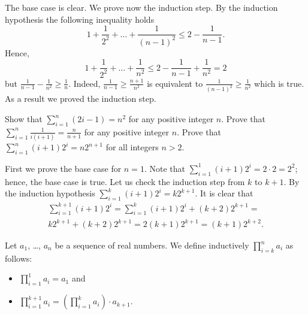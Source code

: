 \begin{chapterendexercises}
\begin{solution}
        The base case is clear. We prove now the induction step. By the induction
        hypothesis the following inequality holds
        \[
          1 + \frac{1}{2^2} + \dots + \frac{1}{(n - 1)^2} \le 2 - \frac{1}{n - 1}.
        \]
        Hence,
        \[
          1 + \frac{1}{2^2} + \dots + \frac{1}{n^2} \le 2 - \frac{1}{n - 1} + \frac{1}{n^2} = 2
        \]
        but $\frac{1}{n - 1} - \frac{1}{n^2} \ge \frac{1}{n}$. Indeed,
        $\frac{1}{n - 1} \ge \frac{n + 1}{n^2}$ is equivalent to
        $\frac{1}{(n - 1)^2} \ge \frac{1}{n^2}$ which is true. As a result we proved
        the induction step.
      \end{solution}
    \exercise Show that $\sum_{i = 1}^n (2i - 1) = n^2$ for any positive
        integer $n$.
    \exercise Prove that $\sum_{i = 1}^n \frac{1}{i (i + 1)} =
        \frac{n}{n + 1}$ for any positive integer $n$.
    \exercise Prove that $\sum_{i = 1}^n (i + 1) 2^i = n 2^{n + 1}$
        for all integers $n > 2$.
        \begin{solution}
          First we prove the base case for $n = 1$. Note that 
          $\sum\limits_{i = 1}^1 (i + 1) 2^i = 2 \cdot 2 = 2^2$; hence, the base
          case is true. Let us check the induction step from $k$ to $k + 1$. By
          the induction hypothesis 
          $\sum\limits_{i = 1}^k (i + 1) 2^i = k 2^{k + 1}$.
          It is clear that
          \begin{multline*}
            \sum_{i = 1}^{k + 1} (i + 1) 2^i =
            \sum_{i = 1}^k (i + 1) 2^i + (k + 2) 2^{k + 1} = \\
            k 2^{k + 1} + (k + 2) 2^{k + 1} =
            2 (k + 1) 2^{k + 1} = (k + 1) 2^{k + 2}.
          \end{multline*}
        \end{solution}
    \exercise Let $a_1$, \dots, $a_n$ be a sequence of real numbers.
        We define inductively
        $\prod_{i = k}^n a_i$ as follows:
        \begin{itemize}
            \item $\prod_{i = 1}^1 a_i = a_1$ and
            \item $\prod_{i = 1}^{k + 1} a_i =
                \left( \prod_{i = 1}^k a_i \right) \cdot a_{k + 1}$.
        \end{itemize}


\end{chapterendexercises}
